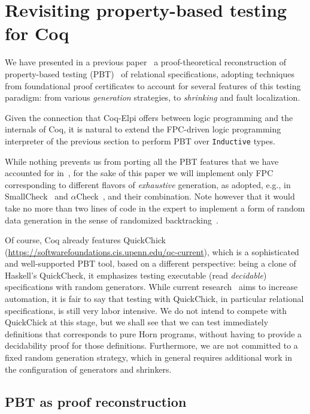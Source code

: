 \section{Revisiting property-based testing for Coq}

We have presented in a previous paper~\cite{blanco19ppdp} a
proof-theoretical reconstruction of property-based testing (PBT)~\cite{fink97sen}
of
relational specifications, adopting techniques from foundational proof
certificates to account for several features of this testing
paradigm: from various \emph{generation} strategies, to
\emph{shrinking} and fault localization.

Given the connection that Coq-Elpi offers between logic
programming and the internals of Coq, it is natural to extend the
FPC-driven logic programming interpreter of the previous section to
perform PBT over \lstinline{Inductive} types.

While nothing prevents us from porting all the PBT features that we have
accounted for in~\cite{blanco19ppdp}, for the sake of this paper we
will implement only FPC corresponding to different flavors of
\emph{exhaustive} generation, as adopted, e.g., in
SmallCheck~\cite{smallcheck} and
$\alpha$Check~\cite{cheney_momigliano_2017}, and their
combination. Note however that it would take  no more than two lines of
code in the  expert to implement a form of random data
generation in the sense of randomized
backtracking~\cite{pltredexconstraintlogic}.

Of course, Coq already features \textsf{QuickChick}~\cite{QChick}
(\url{https://softwarefoundations.cis.upenn.edu/qc-current}), which is
a sophisticated and well-supported PBT tool, based on a different
perspective: being a clone of Haskell's QuickCheck, it emphasizes
testing executable (read \emph{decidable}) specifications with random
generators. While current research~\cite{LampropoulosPP18} aims to
increase automation, it is fair to say that testing with
\textsf{QuickChick}, in particular relational specifications, is
still very labor intensive. We do not intend to compete with
\textsf{QuickChick} at this stage, but we shall see that we can test immediately
 definitions that corresponds to pure Horn
programs, without having to provide a decidability
proof for those definitions. Furthermore, we are not committed to a
fixed random generation strategy, which in general requires additional
work in the configuration of generators and shrinkers.

\subsection{PBT as proof reconstruction}
\label{ssec:pbt-lp}


